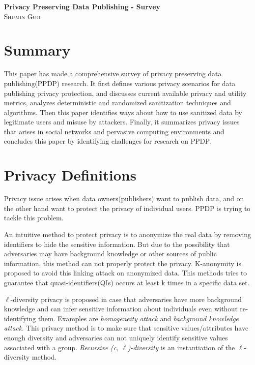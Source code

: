 \documentclass[12pt]{article}
\begin{document}
\begin{center}                  %
\textbf{\large{Privacy Preserving Data Publishing - Survey}} \\ 
\small\textsc{Shumin Guo} \\
\end{center}

\section*{Summary} 
This paper has made a comprehensive survey of privacy preserving data
publishing(PPDP) research. It first defines various privacy scenarios for
data publishing privacy protection, and discusses current available
privacy and utility metrics, analyzes deterministic and randomized
sanitization techniques and algorithms. Then this paper identifies ways
about how to use sanitized data by legitimate users and misuse by
attackers. Finally, it summarizes privacy issues that arises in social
networks and pervasive computing environments and concludes this paper
by identifying challenges for research on PPDP.

\section*{Privacy Definitions} 
Privacy issue arises when data owners(publishers) want to publish
data, and on the other hand want to protect the privacy of individual
users. PPDP is trying to tackle this problem. 

An intuitive method to protect privacy is to anonymize the
real data by removing identifiers to hide the sensitive
information. But due to the possibility that adversaries may have
background knowledge or other sources of public information, this
method can not properly protect the privacy. K-anonymity is proposed
to avoid this linking attack on anonymized data. This methods tries to
guarantee that quasi-identifiers(QIs) occurs at least k times in a
specific data set. 

$\ell$-diversity privacy is proposed in case that adversaries have more
background knowledge and can infer sensitive information about
individuals even without re-identifying them. Examples are
\emph{homogeneity attack} and \emph{background knowledge attack}. This
privacy method is to make sure that sensitive values/attributes have
enough diversity and adversaries can not uniquely identify sensitive
values associated with a group. \emph{Recursive (c, $\ell$)-diversity} is
an instantiation of the $\ell$-diversity method.  
\end{document}
